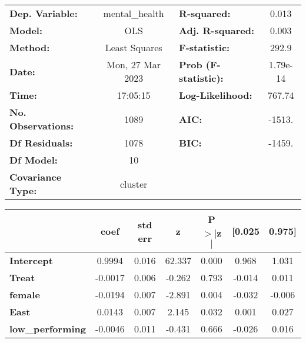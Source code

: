 \begin{center}
\begin{tabular}{lclc}
\toprule
\textbf{Dep. Variable:}       &  mental\_health  & \textbf{  R-squared:         } &     0.013   \\
\textbf{Model:}               &       OLS        & \textbf{  Adj. R-squared:    } &     0.003   \\
\textbf{Method:}              &  Least Squares   & \textbf{  F-statistic:       } &     292.9   \\
\textbf{Date:}                & Mon, 27 Mar 2023 & \textbf{  Prob (F-statistic):} &  1.79e-14   \\
\textbf{Time:}                &     17:05:15     & \textbf{  Log-Likelihood:    } &    767.74   \\
\textbf{No. Observations:}    &        1089      & \textbf{  AIC:               } &    -1513.   \\
\textbf{Df Residuals:}        &        1078      & \textbf{  BIC:               } &    -1459.   \\
\textbf{Df Model:}            &          10      & \textbf{                     } &             \\
\textbf{Covariance Type:}     &     cluster      & \textbf{                     } &             \\
\bottomrule
\end{tabular}
\begin{tabular}{lcccccc}
                              & \textbf{coef} & \textbf{std err} & \textbf{z} & \textbf{P$> |$z$|$} & \textbf{[0.025} & \textbf{0.975]}  \\
\midrule
\textbf{Intercept}            &       0.9994  &        0.016     &    62.337  &         0.000        &        0.968    &        1.031     \\
\textbf{Treat}                &      -0.0017  &        0.006     &    -0.262  &         0.793        &       -0.014    &        0.011     \\
\textbf{female}               &      -0.0194  &        0.007     &    -2.891  &         0.004        &       -0.032    &       -0.006     \\
\textbf{East}                 &       0.0143  &        0.007     &     2.145  &         0.032        &        0.001    &        0.027     \\
\textbf{low\_performing}      &      -0.0046  &        0.011     &    -0.431  &         0.666        &       -0.026    &        0.016     \\

\end{tabular}
\end{center}
